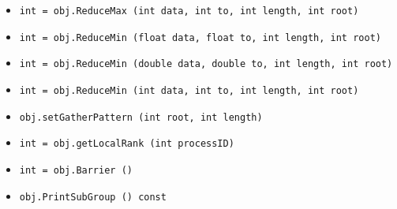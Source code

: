 \begin{itemize}
\item  \verb|int = obj.ReduceMax (int data, int to, int length, int root)|

\item  \verb|int = obj.ReduceMin (float data, float to, int length, int root)|

\item  \verb|int = obj.ReduceMin (double data, double to, int length, int root)|

\item  \verb|int = obj.ReduceMin (int data, int to, int length, int root)|

\item  \verb|obj.setGatherPattern (int root, int length)|

\item  \verb|int = obj.getLocalRank (int processID)|

\item  \verb|int = obj.Barrier ()|

\item  \verb|obj.PrintSubGroup () const|

\end{itemize}
